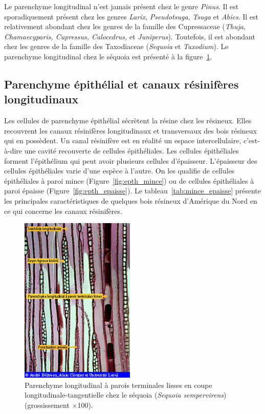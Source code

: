 Le parenchyme longitudinal n'est jamais présent chez le genre \textit{Pinus}. Il est sporadiquement présent chez les genres \textit{Larix}, \textit{Pseudotsuga}, \textit{Tsuga} et \textit{Abies}. Il est relativement abondant chez les genres de la famille des Cupressaceae (\textit{Thuja, Chamaecyparis, Cupressus, Calocedrus,} et \textit{Juniperus}). Toutefois, il est abondant chez les genres de la famille des Taxodiaceae (\textit{Sequoia} et \textit{Taxodium}). Le parenchyme longitudinal chez le séquoia est présenté à la figure~\ref{fig:par_long}.\\

\subsection{Parenchyme épithélial et canaux résinifères longitudinaux}

Les cellules de parenchyme épithélial sécrètent la résine chez les résineux. Elles recouvrent les canaux résinifères longitudinaux et transversaux des bois résineux qui en possèdent. Un canal résinifère est en réalité un espace intercellulaire, c'est-à-dire une cavité recouverte de cellules épithéliales. Les cellules épithéliales forment l'épithélium qui peut avoir plusieurs cellules d'épaisseur. L'épaisseur des cellules épithéliales varie d'une espèce à l'autre. On les qualifie de cellules épithéliales à paroi mince (Figure~\ref{fig:epth_mince}) ou de cellules épithéliales à paroi épaisse (Figure~\ref{fig:epth_epaisse}). Le tableau~\ref{tab:mince_epaisse} présente les principales caractéristiques de quelques bois résineux d'Amérique du Nord en ce qui concerne les canaux résinifères.


\begin{figure}[h]
\centering
\includegraphics[scale=0.7]{img/parenchyme_long}
\caption{Parenchyme longitudinal à parois terminales lisses en coupe longitudinale-tangentielle chez le séquoia (\textit{Sequoia sempervirens}) (grossissement $\times$100).}
\label{fig:par_long}
\end{figure}

